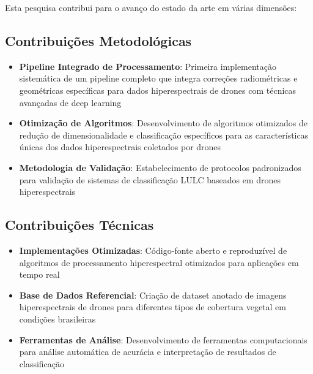 Esta pesquisa contribui para o avanço do estado da arte em várias dimensões:

\subsection{Contribuições Metodológicas}
\begin{itemize}
    \item \textbf{Pipeline Integrado de Processamento}: Primeira implementação sistemática de um pipeline completo que integra correções radiométricas e geométricas específicas para dados hiperespectrais de drones com técnicas avançadas de deep learning
    
    \item \textbf{Otimização de Algoritmos}: Desenvolvimento de algoritmos otimizados de redução de dimensionalidade e classificação específicos para as características únicas dos dados hiperespectrais coletados por drones
    
    \item \textbf{Metodologia de Validação}: Estabelecimento de protocolos padronizados para validação de sistemas de classificação LULC baseados em drones hiperespectrais
\end{itemize}

\subsection{Contribuições Técnicas}
\begin{itemize}
    \item \textbf{Implementações Otimizadas}: Código-fonte aberto e reproduzível de algoritmos de processamento hiperespectral otimizados para aplicações em tempo real
    
    \item \textbf{Base de Dados Referencial}: Criação de dataset anotado de imagens hiperespectrais de drones para diferentes tipos de cobertura vegetal em condições brasileiras
    
    \item \textbf{Ferramentas de Análise}: Desenvolvimento de ferramentas computacionais para análise automática de acurácia e interpretação de resultados de classificação
\end{itemize}

